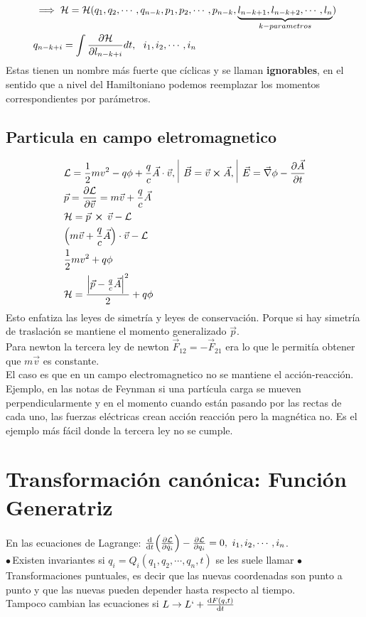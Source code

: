 \documentclass[12pt]{article}
\newcommand{\s}[1]{\section{#1}}
\newcommand{\mc}[1]{\mathcal{#1}}
\newcommand{\pc}[2]{\vec{#1}\, \cross\, \vec{#2}}
\renewcommand{\ss}[1]{\subsection{#1}}
\newcommand{\xn}[1]{{#1}_{1},{#1}_{2},\cdots,{#1}_{n}}
\newcommand{\pua}{$\bullet \, $}
\begin{document}
\begin{align}
&\implies \mc{H} = \mc{H}(q_1,q_2,\cdots,q_{n-k},p_1,p_2,\cdots,p_{n-k},\underbrace{l_{n-k+1}, l_{n-k+2},\cdots, l_{n}}_{k-parametros})\\
&q_{n-k+i}=	\int \pdv{\mc{H} }{l_{n-k+i}}dt ,\,\,\,\, \xn{i}
\end{align}
Estas tienen un nombre más fuerte que cíclicas y se llaman \textbf{ignorables}, en el sentido que a nivel del Hamiltoniano podemos reemplazar los momentos correspondientes por parámetros.
\ss{Particula en campo eletromagnetico}
\begin{align}
&\mc{L}= \frac{1}{2}mv^2 - q\phi + \frac{q}{c}\vec{A}\cdot\vec{v},\,\,\vline \,\, \vec{B}= \vec{v}\cross \vec{A},\,\, \vline \,\, \vec{E} = \vec{\nabla}\phi - \pdv{\vec{A}}{t}\\	
&\vec{p}= \pdv{\mc{L}}{\vec{v}}=m \vec{v} + \frac{q}{c}\vec{A}\\
&\mc{H} = \pc{p}{v}-\mc{L}\\
 &\qty(m \vec{v} + \frac{q}{c}\vec{A})\cdot \vec{v} - \mc{L}\\
 &\frac{1}{2}m v^2 + q\phi\\
& \mc{H}= \frac{\qty|\vec{p}-\frac{q}{c}\vec{A}|^2}{2}+q\phi
\end{align}
Esto enfatiza las leyes de simetría y leyes de conservación. Porque si hay simetría de traslación se mantiene el momento generalizado $\vec{p}$.\\
Para newton la tercera ley de newton $\vec{F}_{12}=-\vec{F}_{21} $ era lo que le permitía obtener que $m\vec{v}$ es constante.\\
El caso es que en un campo electromagnetico no se mantiene el acción-reacción.\\
Ejemplo, en las notas de Feynman si una partícula carga se mueven perpendicularmente y en el momento cuando están pasando por las rectas de cada uno, las fuerzas eléctricas crean acción reacción pero la magnética no. Es el ejemplo más fácil donde la tercera ley no se cumple.  
\newpage
\s{Transformación canónica: Función Generatriz }
En las ecuaciones de Lagrange: $\dv{t} \qty(\pdv{\mc{L}}{\dot{q}_i})-\pdv{\mc{L}}{q_i}=0,\,\, \xn{i}$.\\
\pua Existen invariantes si $q_i = Q_i (\xn{q},t)$ se les suele llamar \pua Transformaciones puntuales, es decir que las nuevas coordenadas son punto a punto y que las nuevas pueden depender hasta respecto al tiempo.\\
Tampoco cambian las ecuaciones si $L \rightarrow L` + \dv{F(q,t)}{t}$\\
\end{document}
